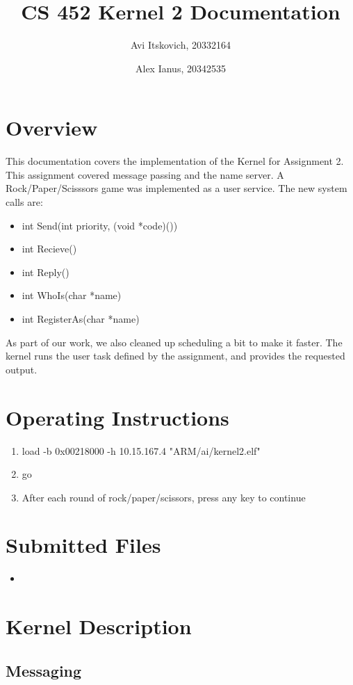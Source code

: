\documentclass{article}
\title{CS 452 Kernel 2 Documentation}
\author{
  Avi Itskovich, 20332164
  \and
  Alex Ianus, 20342535
}
\begin{document}
\maketitle

\section{Overview}

This documentation covers the implementation of the Kernel for Assignment 2. This assignment covered message passing and the name server. A Rock/Paper/Scisssors game was implemented as a user service. The new system calls are: 
\begin{itemize}
  \item int Send(int priority, (void *code)())
  \item int Recieve()
  \item int Reply()
  \item int WhoIs(char *name)
  \item int RegisterAs(char *name)
\end{itemize}
As part of our work, we also cleaned up scheduling a bit to make it faster. The kernel runs the user task defined by the assignment, and provides the requested output.

\section{Operating Instructions}
\begin{enumerate}
  \item load -b 0x00218000 -h 10.15.167.4 "ARM/ai/kernel2.elf"
  \item go
  \item After each round of rock/paper/scissors, press any key to continue
\end{enumerate}

\section{Submitted Files}
\begin{itemize}
    \item
\end{itemize}

\section{Kernel Description}

\subsection{Messaging}
\end{document}
